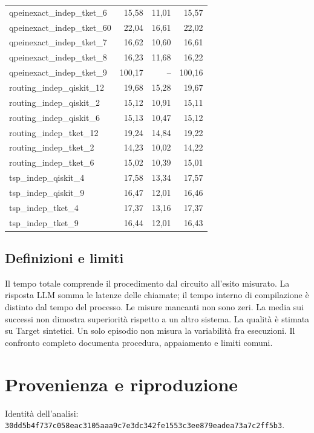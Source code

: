 \begin{longtable}{lrrr}
qpeinexact\_indep\_tket\_6 & 15,58 & 11,01 & 15,57 \\
qpeinexact\_indep\_tket\_60 & 22,04 & 16,61 & 22,02 \\
qpeinexact\_indep\_tket\_7 & 16,62 & 10,60 & 16,61 \\
qpeinexact\_indep\_tket\_8 & 16,23 & 11,68 & 16,22 \\
qpeinexact\_indep\_tket\_9 & 100,17 & -- & 100,16 \\
routing\_indep\_qiskit\_12 & 19,68 & 15,28 & 19,67 \\
routing\_indep\_qiskit\_2 & 15,12 & 10,91 & 15,11 \\
routing\_indep\_qiskit\_6 & 15,13 & 10,47 & 15,12 \\
routing\_indep\_tket\_12 & 19,24 & 14,84 & 19,22 \\
routing\_indep\_tket\_2 & 14,23 & 10,02 & 14,22 \\
routing\_indep\_tket\_6 & 15,02 & 10,39 & 15,01 \\
tsp\_indep\_qiskit\_4 & 17,58 & 13,34 & 17,57 \\
tsp\_indep\_qiskit\_9 & 16,47 & 12,01 & 16,46 \\
tsp\_indep\_tket\_4 & 17,37 & 13,16 & 17,37 \\
tsp\_indep\_tket\_9 & 16,44 & 12,01 & 16,43 \\
\end{longtable}
\endgroup
\begin{samepage}\subsection{Definizioni e limiti}
Il tempo totale comprende il procedimento dal circuito all’esito misurato. La risposta LLM somma le latenze delle chiamate; il tempo interno di compilazione è distinto dal tempo del processo. Le misure mancanti non sono zeri. La media sui successi non dimostra superiorità rispetto a un altro sistema. La qualità è stimata su Target sintetici. Un solo episodio non misura la variabilità fra esecuzioni. Il confronto completo documenta procedura, appaiamento e limiti comuni.
\par\end{samepage}
\FloatBarrier\section{Provenienza e riproduzione}
Identità dell’analisi: \nolinkurl{30dd5b4f737c058eac3105aaa9c7e3dc342fe1553c3ee879eadea73a7c2ff5b3}.


